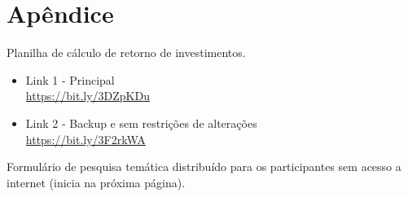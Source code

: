 
\chapter*{Apêndice} \label{appendix} 



\begin{minipage}{\linewidth} \label{sheetdownload}
\noindent
{} Planilha de cálculo de retorno de investimentos.\\

\begin{itemize}
	\item Link 1 - Principal\\
	\url{https://bit.ly/3DZpKDu} %
	
	\item Link 2 - Backup e sem restrições de alterações\\
	\url{https://bit.ly/3F2rkWA}
\end{itemize} 
 
 
\noindent 
  Formulário de pesquisa temática distribuído para os participantes sem acesso a internet (inicia na próxima página).
 
\end{minipage}

\rfoot{\thepage}
 	

  
 
  
